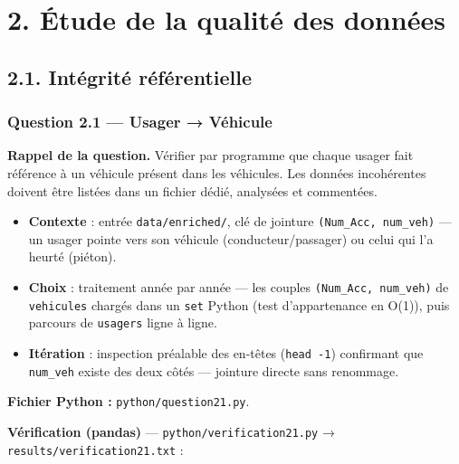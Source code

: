 \documentclass[11pt,a4paper]{article}
\newcommand{\rub}[2]{\textbf{\textcolor{#1}{#2}}}
\begin{document}
\section*{2. Étude de la qualité des données}

\subsection*{2.1. Intégrité référentielle}

\clearpage
\subsubsection*{Question 2.1 — Usager → Véhicule}

\rub{labrappel}{Rappel de la question.} Vérifier par programme que chaque usager fait référence à un véhicule présent dans les véhicules. Les données incohérentes doivent être listées dans un fichier dédié, analysées et commentées.

\begin{agentbox}
\begin{itemize}
\item \textbf{Contexte} : entrée \texttt{data/enriched/}, clé de jointure \texttt{(Num\_Acc, num\_veh)} — un usager pointe vers son véhicule (conducteur/passager) ou celui qui l'a heurté (piéton).
\item \textbf{Choix} : traitement année par année — les couples \texttt{(Num\_Acc, num\_veh)} de \texttt{vehicules} chargés dans un \texttt{set} Python (test d'appartenance en O(1)), puis parcours de \texttt{usagers} ligne à ligne.
\item \textbf{Itération} : inspection préalable des en-têtes (\texttt{head -1}) confirmant que \texttt{num\_veh} existe des deux côtés — jointure directe sans renommage.
\end{itemize}
\end{agentbox}

\rub{labfichier}{Fichier Python :} \texttt{python/question21.py}.

\rub{labverif}{Vérification (pandas)} --- \texttt{python/verification21.py} → \texttt{results/verification21.txt} :
\end{document}
